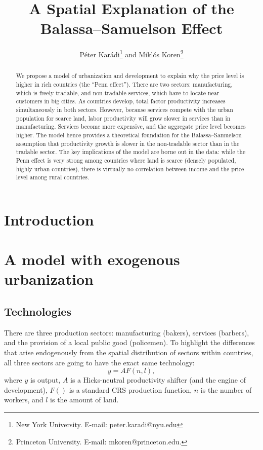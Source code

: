 \documentclass[12pt]{article}
\begin{document}
\title{A Spatial Explanation of the Balassa--Samuelson Effect}
\author{P\'eter Kar\'adi\thanks{New York University. E-mail: peter.karadi@nyu.edu} and Mikl\'os Koren\thanks{Princeton University. E-mail: mkoren@princeton.edu.}}
\maketitle

\begin{abstract}
We propose a model of urbanization and development to explain why the price level is higher in rich countries (the ``Penn effect''). There are two sectors: manufacturing, which is freely tradable, and non-tradable services, which have to locate near customers in big cities. As countries develop, total factor productivity increases simultaneously in both sectors. However, because services compete with the urban population for scarce land, labor productivity will grow slower in services than in manufacturing. Services become more expensive, and the aggregate price level becomes higher. The model hence provides a theoretical foundation for the Balassa--Samuelson assumption that productivity growth is slower in the non-tradable sector than in the tradable sector. The key implications of the model are borne out in the data: while the Penn effect is very strong among countries where land is scarce (densely populated, highly urban countries), there is virtually no correlation between income and the price level among rural countries.
\end{abstract}

\section{Introduction}
\section{A model with exogenous urbanization}
\subsection{Technologies}
There are three production sectors: manufacturing (bakers), services (barbers), and the provision of a local public good (policemen). To highlight the differences that arise endogenously from the spatial distribution of sectors within countries, all three sectors are going to have the exact same technology:
\[
y = AF(n,l),
\]
where $y$ is output, $A$ is a Hicks-neutral productivity shifter (and the engine of development), $F()$ is a standard CRS production function, $n$ is the number of workers, and $l$ is the amount of land.
\end{document}
